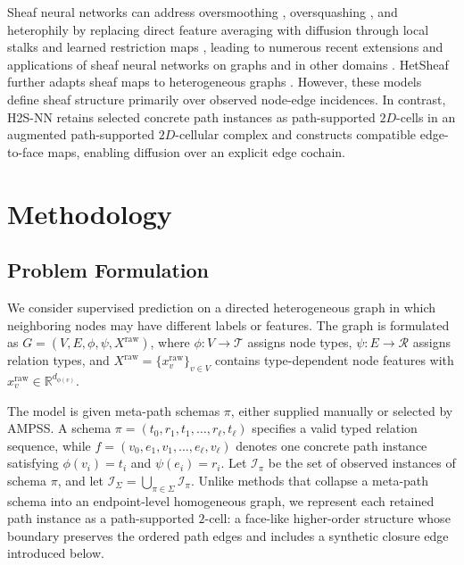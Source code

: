 \documentclass[sigconf,anonymous,review]{acmart}
\newcommand{\R}{\mathbb{R}}
\newcommand{\method}{\textsc{H2S-NN}}
\newcommand{\ampss}{\textsc{AMPSS}}
\begin{document}
Sheaf neural networks can address oversmoothing \cite{cai2020note}, oversquashing \cite{alon2021bottleneck}, and heterophily by replacing direct
feature averaging with diffusion through local stalks and learned restriction maps
\cite{hansen2020sheaf,bodnar2022neural}, leading to numerous recent extensions and applications of sheaf neural networks on graphs and in other domains
\cite{barbero2022sheaf,hernandez2024jointdifsheaf,fiorini2025sheaves,mule2025directional,ribeiro2026cooperative,purificato2025sheaf4rec}. HetSheaf further adapts sheaf maps to heterogeneous graphs \cite{braithwaite2024heterogeneous}.  However, these models
define sheaf structure primarily over observed node-edge incidences. In contrast, \method{} retains selected concrete path instances as path-supported \(2D\)-cells in an augmented path-supported \(2D\)-cellular complex and constructs compatible edge-to-face maps, enabling diffusion over an explicit edge cochain.

\section{Methodology}
\label{sec:method}

\subsection{Problem Formulation}

We consider supervised prediction on a directed heterogeneous graph in which neighboring nodes may have different labels or features. The graph is formulated as
\(G=(V,E,\phi,\psi,X^{\mathrm{raw}})\), where
\(\phi:V\rightarrow\mathcal{T}\) assigns node types,
\(\psi:E\rightarrow\mathcal{R}\) assigns relation types, and
\(X^{\mathrm{raw}}=\{x_v^{\mathrm{raw}}\}_{v\in V}\) contains type-dependent node features with
\(x_v^{\mathrm{raw}}\in\R^{d_{\phi(v)}}\). 

The model is given meta-path schemas
\(\pi\), either supplied manually or selected by \ampss{}.  A schema
\(\pi=(t_0,r_1,t_1,\ldots,r_\ell,t_\ell)\) specifies a valid typed relation sequence, while
\(f=(v_0,e_1,v_1,\ldots,e_\ell,v_\ell)\) denotes one concrete path instance satisfying
\(\phi(v_i)=t_i\) and \(\psi(e_i)=r_i\).  Let \(\mathcal{I}_\pi\) be the set of observed
instances of schema \(\pi\), and let
\(\mathcal{I}_\Sigma=\bigcup_{\pi\in\Sigma}\mathcal{I}_\pi\).  Unlike methods that collapse a
meta-path schema into an endpoint-level homogeneous graph, we represent each retained path instance as a path-supported \(2\)-cell: a face-like higher-order structure whose boundary preserves the ordered path
edges and includes a synthetic closure edge introduced below.
\end{document}
